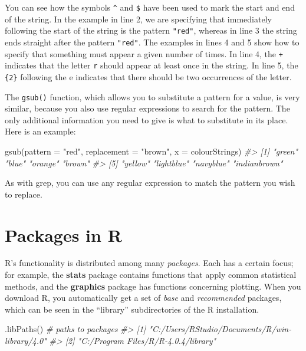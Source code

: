 \documentclass[
]{book}
\newenvironment{Shaded}{\begin{snugshade}}{\end{snugshade}}
\newcommand{\AttributeTok}[1]{\textcolor[rgb]{0.77,0.63,0.00}{#1}}
\newcommand{\CommentTok}[1]{\textcolor[rgb]{0.56,0.35,0.01}{\textit{#1}}}
\newcommand{\FunctionTok}[1]{\textcolor[rgb]{0.00,0.00,0.00}{#1}}
\newcommand{\NormalTok}[1]{#1}
\newcommand{\StringTok}[1]{\textcolor[rgb]{0.31,0.60,0.02}{#1}}
\begin{document}
You can see how the symbols \texttt{\^{}} and \texttt{\$} have been used to mark the start and end of the string. In the example in line 2, we are specifying that immediately following the start of the string is the pattern \texttt{"red"}, whereas in line 3 the string ends straight after the pattern \texttt{"red"}. The examples in lines 4 and 5 show how to specify that something must appear a given number of times. In line 4, the \texttt{+} indicates that the letter \texttt{r} should appear at least once in the string. In line 5, the \texttt{\{2\}} following the e indicates that there should be two occurrences of the letter.

The \texttt{gsub()} function, which allows you to substitute a pattern for a value, is very similar, because you also use regular expressions to search for the pattern. The only additional information you need to give is what to substitute in its place. Here is an example:

\begin{Shaded}
\begin{Highlighting}[]
\FunctionTok{gsub}\NormalTok{(}\AttributeTok{pattern =} \StringTok{"red"}\NormalTok{, }\AttributeTok{replacement =} \StringTok{"brown"}\NormalTok{, }\AttributeTok{x =}\NormalTok{ colourStrings)}
\CommentTok{\#\textgreater{} [1] "green"       "blue"        "orange"      "brown"      }
\CommentTok{\#\textgreater{} [5] "yellow"      "lightblue"   "navyblue"    "indianbrown"}
\end{Highlighting}
\end{Shaded}

As with grep, you can use any regular expression to match the pattern you wish to replace.

\hypertarget{packages-in-r}{%
\section{Packages in R}\label{packages-in-r}}

R's functionality is distributed among many \emph{packages}. Each has a certain focus; for example, the \textbf{stats} package contains functions that apply common statistical methods, and the \textbf{graphics} package has functions concerning plotting. When you download R, you automatically get a set of \emph{base} and \emph{recommended} packages, which can be seen in the ``library'' subdirectories of the R installation.

\begin{Shaded}
\begin{Highlighting}[]
\FunctionTok{.libPaths}\NormalTok{() }\CommentTok{\# paths to packages}
\CommentTok{\#\textgreater{} [1] "C:/Users/RStudio/Documents/R/win{-}library/4.0"}
\CommentTok{\#\textgreater{} [2] "C:/Program Files/R/R{-}4.0.4/library"}
\end{Highlighting}
\end{Shaded}
\end{document}
